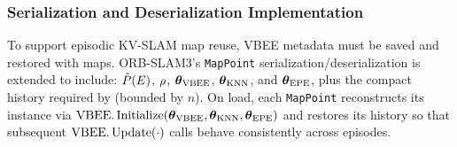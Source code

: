 \subsubsection{Serialization and Deserialization Implementation}

To support episodic KV-SLAM map reuse, VBEE metadata must be saved and restored with maps. ORB-SLAM3’s \texttt{MapPoint} serialization/deserialization is extended to include: \(\hat{P}(E)\), \(\rho\), \(\boldsymbol{\theta}_{\text{VBEE}}\), \(\boldsymbol{\theta}_{\text{KNN}}\), and \(\boldsymbol{\theta}_{\text{EPE}}\), plus the compact history required by \knn{} (bounded by \(n\)). On load, each \texttt{MapPoint} reconstructs its \vbee{} instance via \(\text{VBEE}.\operatorname{Initialize}(\boldsymbol{\theta}_{\text{VBEE}},\boldsymbol{\theta}_{\text{KNN}},\boldsymbol{\theta}_{\text{EPE}})\) and restores its history so that subsequent \(\text{VBEE}.\operatorname{Update}(\cdot)\) calls behave consistently across episodes.
